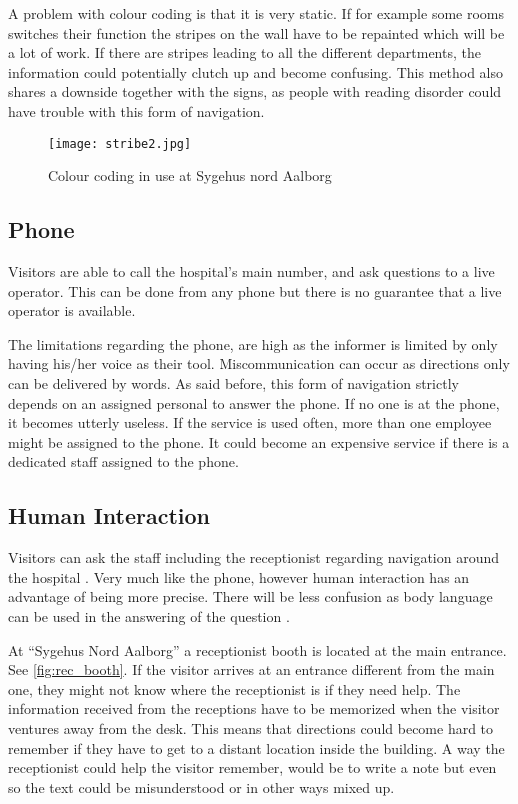 A problem with colour coding is that it is very static. If for example some rooms switches their function the stripes on the wall have to be repainted which will be a lot of work. If there are stripes leading to all the different departments, the information could potentially clutch up and become confusing. This method also shares a downside together with the signs, as people with reading disorder could have trouble with this form of navigation.

\begin{figure}[htb]
  \begin{center} 
    \texttt{[image: stribe2.jpg]}
  \end{center}
  \caption{Colour coding in use at Sygehus nord Aalborg}
  \label{fig:colour_floor}
\end{figure}




\subsection{Phone}\label{sub:pho}
Visitors are able to call the hospital's main number, and ask questions to a live operator. This can be done from any phone but there is no guarantee that a live operator is available. \cite{Vendsyssel}
 
The limitations regarding the phone, are high as the informer is limited by only having his/her voice as their tool. Miscommunication can occur as directions only can be delivered by words. As said before, this form of navigation strictly depends on an assigned personal to answer the phone. If no one is at the phone, it becomes utterly useless.
If the service is used often, more than one employee might be assigned to the phone. It could become an expensive service if there is a dedicated staff assigned to the phone.


\subsection{Human Interaction}\label{sub:human}
Visitors can ask the staff including the receptionist regarding navigation around the hospital \cite{job}. Very much like the phone, however human interaction has an advantage of being more precise. There will be less confusion as body language can be used in the answering of the question \cite{body_vs_phone}.

At \enquote{Sygehus Nord Aalborg} a receptionist booth is located at the main entrance. See \cref{fig:rec_booth}. If the visitor arrives at an entrance different from the main one, they might not know where the receptionist is if they need help. The information received from the receptions have to be memorized when the visitor ventures away from the desk. This means that directions could become hard to remember if they have to get to a distant location inside the building. A way the receptionist could help the visitor remember, would be to write a note but even so the text could be misunderstood or in other ways mixed up.

